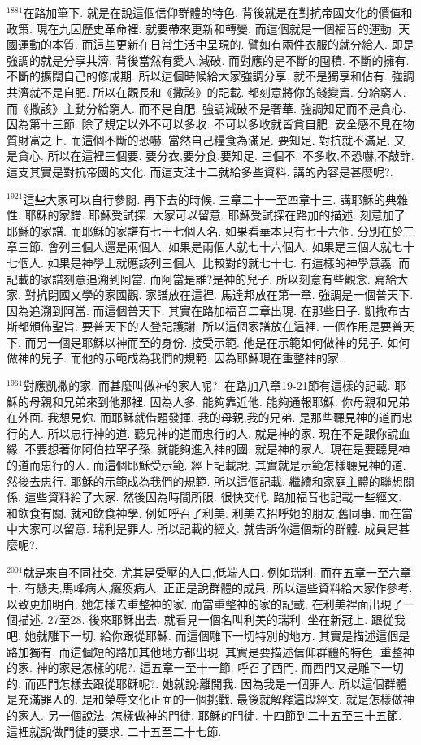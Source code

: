 \documentclass{book}
\begin{document}
$^{1881}$在路加筆下.
就是在說這個信仰群體的特色.
背後就是在對抗帝國文化的價值和政策.
現在九因歷史革命裡.
就要帶來更新和轉變.
而這個就是一個福音的運動.
天國運動的本質.
而這些更新在日常生活中呈現的.
譬如有兩件衣服的就分給人.
即是強調的就是分享共濟.
背後當然有愛人,減破.
而對應的是不斷的囤積.
不斷的擁有.
不斷的擴闊自己的修成期.
所以這個時候給大家強調分享.
就不是獨享和佔有.
強調共濟就不是自肥.
所以在觀長和《撒該》的記載.
都刻意將你的錢變賣.
分給窮人.
而《撒該》主動分給窮人.
而不是自肥.
強調減破不是奢華.
強調知足而不是貪心.
因為第十三節.
除了規定以外不可以多收.
不可以多收就皆貪自肥.
安全感不見在物質財富之上.
而這個不斷的恐嚇.
當然自己糧食為滿足.
要知足.
對抗就不滿足.
又是貪心.
所以在這裡三個要.
要分衣,要分食,要知足.
三個不.
不多收,不恐嚇,不敲詐.
這支其實是對抗帝國的文化.
而這支注十二就給多些資料.
講的內容是甚麼呢?.

$^{1921}$這些大家可以自行參閱.
再下去的時候.
三章二十一至四章十三.
講耶穌的典雜性.
耶穌的家譜.
耶穌受試探.
大家可以留意.
耶穌受試探在路加的描述.
刻意加了耶穌的家譜.
而耶穌的家譜有七十七個人名.
如果看華本只有七十六個.
分別在於三章三節.
會列三個人還是兩個人.
如果是兩個人就七十六個人.
如果是三個人就七十七個人.
如果是神學上就應該列三個人.
比較對的就七十七.
有這樣的神學意義.
而記載的家譜刻意追溯到阿當.
而阿當是誰?是神的兒子.
所以刻意有些觀念.
寫給大家.
對抗閉國文學的家國觀.
家譜放在這裡.
馬達邦放在第一章.
強調是一個普天下.
因為追溯到阿當.
而這個普天下.
其實在路加福音二章出現.
在那些日子.
凱撒布古斯都頒佈聖旨.
要普天下的人登記護謝.
所以這個家譜放在這裡.
一個作用是要普天下.
而另一個是耶穌以神而至的身份.
接受示範.
他是在示範如何做神的兒子.
如何做神的兒子.
而他的示範成為我們的規範.
因為耶穌現在重整神的家.

$^{1961}$對應凱撒的家.
而甚麼叫做神的家人呢?.
在路加八章19-21節有這樣的記載.
耶穌的母親和兄弟來到他那裡.
因為人多.
能夠靠近他.
能夠通報耶穌.
你母親和兄弟在外面.
我想見你.
而耶穌就借題發揮.
我的母親,我的兄弟.
是那些聽見神的道而忠行的人.
所以忠行神的道.
聽見神的道而忠行的人.
就是神的家.
現在不是跟你說血緣.
不要想著你阿伯拉罕子孫.
就能夠進入神的國.
就是神的家人.
現在是要聽見神的道而忠行的人.
而這個耶穌受示範.
經上記載說.
其實就是示範怎樣聽見神的道.
然後去忠行.
耶穌的示範成為我們的規範.
所以這個記載.
繼續和家庭主體的聯想關係.
這些資料給了大家.
然後因為時間所限.
很快交代.
路加福音也記載一些經文.
和飲食有關.
就和飲食神學.
例如呼召了利美.
利美去招呼她的朋友,舊同事.
而在當中大家可以留意.
瑞利是罪人.
所以記載的經文.
就告訴你這個新的群體.
成員是甚麼呢?.

$^{2001}$就是來自不同社交.
尤其是受壓的人口,低端人口.
例如瑞利.
而在五章一至六章十.
有懸夫,馬峰病人,癱瘓病人.
正正是說群體的成員.
所以這些資料給大家作參考.
以致更加明白.
她怎樣去重整神的家.
而當重整神的家的記載.
在利美裡面出現了一個描述.
27至28.
後來耶穌出去.
就看見一個名叫利美的瑞利.
坐在新冠上.
跟從我吧.
她就雕下一切.
給你跟從耶穌.
而這個雕下一切特別的地方.
其實是描述這個是路加獨有.
而這個短的路加其他地方都出現.
其實是要描述信仰群體的特色.
重整神的家.
神的家是怎樣的呢?.
這五章一至十一節.
呼召了西門.
而西門又是雕下一切的.
而西門怎樣去跟從耶穌呢?.
她就說:離開我.
因為我是一個罪人.
所以這個群體是充滿罪人的.
是和榮辱文化正面的一個挑戰.
最後就解釋這段經文.
就是怎樣做神的家人.
另一個說法.
怎樣做神的門徒.
耶穌的門徒.
十四節到二十五至三十五節.
這裡就說做門徒的要求.
二十五至二十七節.
\end{document}
